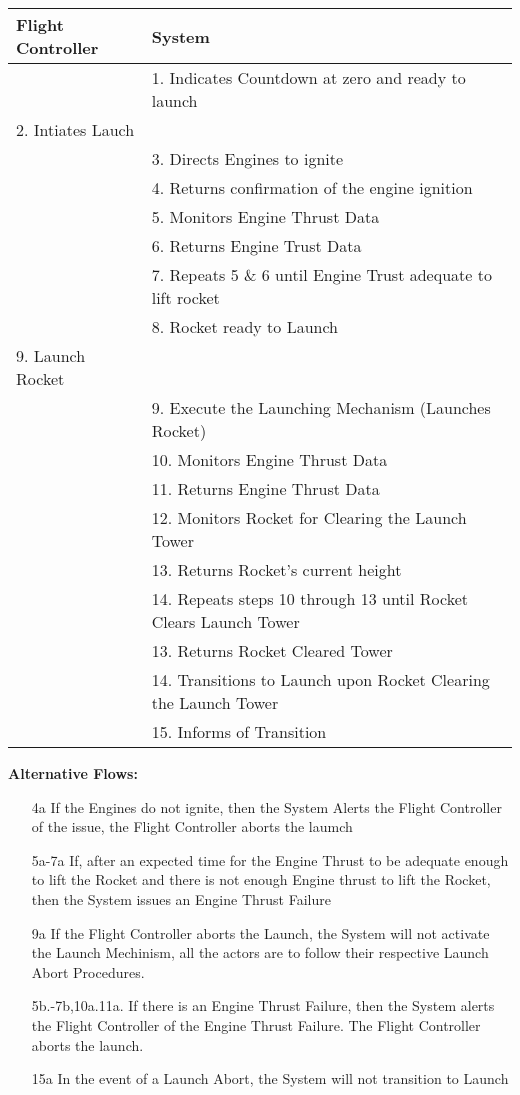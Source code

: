 \documentclass[letterpaper]{article}
\begin{document}
\begin{tabular}{|p{5.75cm}|p{5.75cm}|}\hline
\textbf{Flight Controller} & \textbf{System}\\\hline
&1.  Indicates Countdown at zero and ready to launch\\\hline
2. Intiates Lauch & \\\hline
& 3.  Directs Engines to ignite\\\hline
& 4.  Returns confirmation of the engine ignition\\\hline
& 5.  Monitors Engine Thrust Data\\\hline
& 6.  Returns Engine Trust Data\\\hline
& 7.  Repeats 5 \& 6 until Engine Trust adequate to lift
rocket\\\hline
& 8.  Rocket ready to Launch\\\hline
9. Launch Rocket &\\\hline
& 9.   Execute the Launching Mechanism (Launches Rocket)\\\hline
& 10.  Monitors Engine Thrust Data\\\hline
& 11.  Returns Engine Thrust Data\\\hline
& 12.  Monitors Rocket for Clearing the Launch Tower\\\hline
& 13.  Returns Rocket's current height\\\hline
& 14.  Repeats steps 10 through 13 until Rocket Clears Launch
Tower\\\hline
& 13.  Returns Rocket Cleared Tower\\\hline
& 14.  Transitions to Launch upon Rocket Clearing the Launch
Tower\\\hline
& 15.  Informs of Transition\\\hline 
\end{tabular}
\textbf{Alternative Flows:}
\begin{itemize}
\item[4a]If the Engines do not ignite, then the System Alerts the
Flight Controller of the issue, the Flight Controller aborts the
laumch
\item[5a-7a]If, after an expected time for the Engine Thrust to be
adequate enough to lift the Rocket and there is not enough Engine
thrust to lift the Rocket, then the System issues an Engine
Thrust Failure
\item[9a]If the Flight Controller aborts the Launch, the
System will not activate the Launch Mechinism, all the actors are to
follow their respective Launch Abort Procedures.
\item[5b.-7b,10a.11a.] If there is an Engine Thrust Failure, then the
System alerts the Flight Controller of the Engine Thrust Failure. The
Flight Controller aborts the launch.
\item[15a]In the event of a Launch Abort, the System will not
transition to Launch
\end{itemize}
\end{document}
